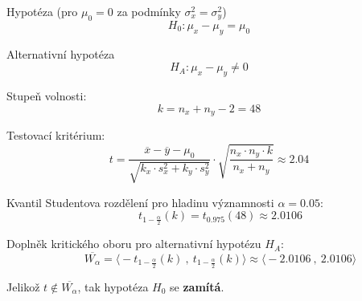 \begin{compactitem}
    \item Hypotéza (pro ${\displaystyle \mu_0 = 0}$ za podmínky ${\displaystyle \sigma_x^2 = \sigma_y^2}$)
    $${\displaystyle H_0 : \mu_x - \mu_y = \mu_0}$$

    \item Alternativní hypotéza
    $${\displaystyle H_A : \mu_x - \mu_y \neq 0}$$

    \item Stupeň volnosti:
    $${\displaystyle k = n_x + n_y -2 = 48}$$

    \item Testovací kritérium:
    $${\displaystyle t = \frac{\overline{x} - \overline{y} - \mu_0}{\sqrt{k_x \cdot s_x^2 + k_y \cdot s_y^2}} \cdot \sqrt{\frac{n_x \cdot n_y \cdot k}{n_x + n_y}} \approx 2.04}$$

    \item Kvantil Studentova rozdělení pro hladinu významnosti ${\displaystyle \alpha = 0.05}$:
    $${\displaystyle \qquad t_{1 - \frac{\alpha}{2}}(k) = t_{0.975}(48) \approx 2.0106}$$

    \item Doplněk kritického oboru pro alternativní hypotézu ${\displaystyle H_{A}}$:
    $${\displaystyle \qquad \overline{W_\alpha} = \big\langle -t_{1 - \frac{\alpha}{2}}(k) ~,~ t_{1 - \frac{\alpha}{2}}(k) \big\rangle \approx \big\langle -2.0106 ~,~ 2.0106 \big\rangle}$$

    \item Jelikož ${\displaystyle t \notin \overline{W_\alpha}}$, tak hypotéza ${\displaystyle H_0}$ se \textbf{zamítá}.
\end{compactitem}
